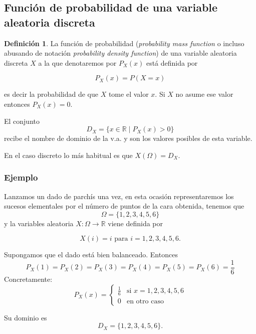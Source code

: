 \documentclass[handout]{beamer}\usepackage[]{graphicx}\usepackage[]{color}
\renewcommand{\emph}[1]{{\color{red}#1}}
\newcommand{\RR}{\mathbb{R}}
\theoremstyle{plain}
\theoremstyle{definition}
\newtheorem{definicion}{Definición}
\begin{document}
\subsection{Función de probabilidad de una variable aleatoria discreta}

\begin{frame}

\begin{definicion}
La \emph{función de probabilidad} (\textsl{probability mass function} o incluso abusando de notación \textsl{probability density function})
de una variable aleatoria discreta $X$ a la que denotaremos por $P_{X}(x)$
está definida por

$$P_{X}(x)=P(X=x)$$

es decir la probabilidad de que $X$ tome el valor $x$. Si $X$ no asume ese valor entonces
$P_{X}(x)=0$.

El conjunto $$D_X=\{ x\in\RR \mid P_X(x)>0\}$$ recibe el nombre de
\emph{dominio} de la v.a. y son los valores posibles de esta variable. 


En el caso discreto lo más habitual es que $X(\Omega)=D_X$.
\end{definicion}
\end{frame}



\begin{frame}
\frametitle{Ejemplo}
Lanzamos un dado de parchís una vez, en esta ocasión representaremos los
sucesos elementales por el número de puntos de la cara obtenida, tenemos que
$$\Omega=\{1,2,3,4,5,6\}$$ 
y la variables aleatoria $X:\Omega\to \RR$ viene definida por

$$X(i)=i\mbox{ para } i=1,2,3,4,5,6.$$
  
Supongamos que el dado está bien balanceado. Entonces
$$P_{X}(1)=P_{X}(2)=P_{X}(3)=P_{X}(4)=P_{X}(5)=P_{X}(6)=\frac{1}{6}$$
Concretamente:
$$
P_{X}(x)=
  \left\{
  \begin{array}{ll}
   \frac{1}{6} & \mbox{si } x=1,2,3,4,5,6\\
  0 & \mbox{en otro caso }
  \end{array}
  \right.
  $$
  
  Su dominio es $$D_X=\{1,2,3,4,5,6\}.$$
%

\end{frame}
\end{document}
